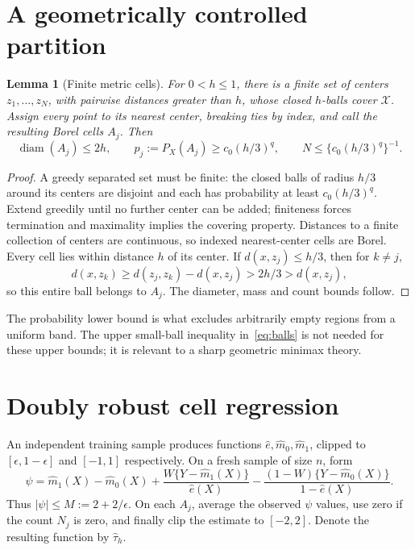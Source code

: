 \documentclass[11pt,a4paper]{article}
\newtheorem{lemma}[theorem]{Lemma}
\theoremstyle{definition}
\theoremstyle{remark}
\begin{document}
\section{A geometrically controlled partition}
\begin{lemma}[Finite metric cells]\label{le:cells}
For $0<h\leq1$, there is a finite set of centers $z_1,\ldots,z_N$, with pairwise distances greater than $h$, whose closed $h$-balls cover $\mathcal X$. Assign every point to its nearest center, breaking ties by index, and call the resulting Borel cells $A_j$. Then
\[
 \operatorname{diam}(A_j)\leq2h,\qquad
 p_j:=P_X(A_j)\geq c_0(h/3)^q,\qquad
 N\leq\{c_0(h/3)^q\}^{-1}.
\]
\end{lemma}
\begin{proof}
A greedy separated set must be finite: the closed balls of radius $h/3$ around its centers are disjoint and each has probability at least $c_0(h/3)^q$. Extend greedily until no further center can be added; finiteness forces termination and maximality implies the covering property. Distances to a finite collection of centers are continuous, so indexed nearest-center cells are Borel. Every cell lies within distance $h$ of its center. If $d(x,z_j)\leq h/3$, then for $k\ne j$,
\[
 d(x,z_k)\geq d(z_j,z_k)-d(x,z_j)>2h/3>d(x,z_j),
\]
so this entire ball belongs to $A_j$. The diameter, mass and count bounds follow.
\end{proof}

The probability lower bound is what excludes arbitrarily empty regions from a uniform band. The upper small-ball inequality in~\eqref{eq:balls} is not needed for these upper bounds; it is relevant to a sharp geometric minimax theory.

\section{Doubly robust cell regression}
An independent training sample produces functions $\widehat e,\widehat m_0,\widehat m_1$, clipped to $[\epsilon,1-\epsilon]$ and $[-1,1]$ respectively. On a fresh sample of size $n$, form
\[
 \psi=\widehat m_1(X)-\widehat m_0(X)
       +\frac{W\{Y-\widehat m_1(X)\}}{\widehat e(X)}
       -\frac{(1-W)\{Y-\widehat m_0(X)\}}{1-\widehat e(X)}.
\]
Thus $|\psi|\leq M:=2+2/\epsilon$. On each $A_j$, average the observed $\psi$ values, use zero if the count $N_j$ is zero, and finally clip the estimate to $[-2,2]$. Denote the resulting function by $\widehat\tau_h$.
\end{document}
